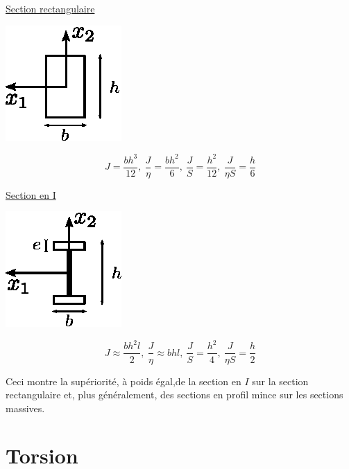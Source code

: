 \underline{Section rectangulaire}
\begin{multicols}{2}
    \begin{center}
        \includegraphics{../images/T1_Ch07-07}
    \end{center}
    \columnbreak
    \begin{displaymath}
        J = \frac{bh^3}{12},\ \frac{J}{\eta} = \frac{bh^2}{6},\ \frac{J}{S} = \frac{h^2}{12},\ \frac{J}{\eta S} = \frac{h}{6}
    \end{displaymath}
\end{multicols}
\underline{Section en I}
\begin{multicols}{2}
    \begin{center}
        \includegraphics{../images/T1_Ch07-08}
    \end{center}
    \columnbreak
    \begin{displaymath}
        J \approx \frac{bh^2l}{2},\ \frac{J}{\eta} \approx bhl,\ \frac{J}{S} = \frac{h^2}{4},\ \frac{J}{\eta S} = \frac{h}{2}
    \end{displaymath}
\end{multicols}
Ceci montre la supériorité, à poids égal,de la section en $I$ sur la section rectangulaire et, plus généralement, des sections en profil mince sur les sections massives.

\section{Torsion} \label{sec:Ch07-2}
